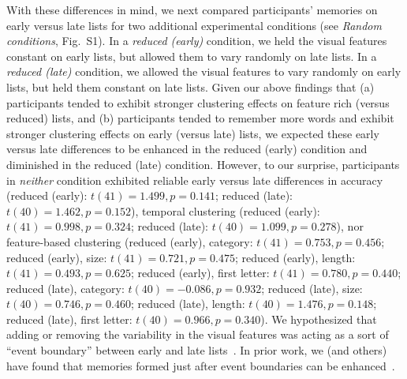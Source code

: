 \documentclass[11pt]{article}
\newcommand{\dynamicsRandom}{S1}
\begin{document}
With these differences in mind, we next compared participants' memories on
early versus late lists for two additional experimental conditions (see
\textit{Random conditions}, Fig.~\dynamicsRandom). In a \textit{reduced
(early)} condition, we held the visual features constant on early lists, but
allowed them to vary randomly on late lists. In a \textit{reduced (late)}
condition, we allowed the visual features to vary randomly on early lists, but
held them constant on late lists. Given our above findings that (a)
participants tended to exhibit stronger clustering effects on feature rich
(versus reduced) lists, and (b) participants tended to remember more words and
exhibit stronger clustering effects on early (versus late) lists, we expected
these early versus late differences to be enhanced in the reduced (early)
condition and diminished in the reduced (late) condition. However, to our
surprise, participants in \textit{neither} condition exhibited reliable early
versus late differences in accuracy (reduced (early): $t(41) = 1.499, p =
0.141$; reduced (late): $t(40) = 1.462, p = 0.152$), temporal clustering
(reduced (early): $t(41) = 0.998, p = 0.324$; reduced (late): $t(40) = 1.099, p
= 0.278$), nor feature-based clustering (reduced (early), category: $t(41) =
0.753, p = 0.456$; reduced (early), size: $t(41) = 0.721, p = 0.475$; reduced
(early), length: $t(41) = 0.493, p = 0.625$; reduced (early), first letter:
$t(41) = 0.780, p = 0.440$; reduced (late), category: $t(40) = -0.086, p =
0.932$; reduced (late), size: $t(40) = 0.746, p = 0.460$; reduced (late),
length: $t(40) = 1.476, p = 0.148$; reduced (late), first letter: $t(40) =
0.966, p = 0.340$). We hypothesized that adding or removing the variability in
the visual features was acting as a sort of ``event boundary'' between early
and late lists~\citep[e.g., ][]{ClewEtal19,RadvZack17,RadvCope06}. In prior
work, we (and others) have found that memories formed just after event
boundaries can be enhanced~\citep[e.g., due to less contextual interference
between pre- and post-boundary items;][]{MannEtal16, PettEtal16, GoldEtal17,
FlorEtal17}.
\end{document}
